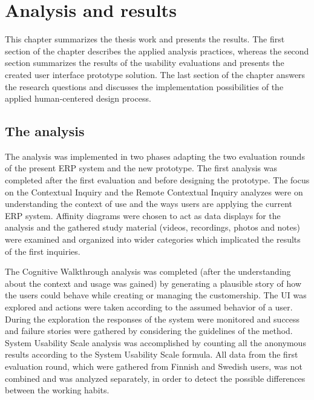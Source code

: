 \documentclass[12pt,a4paper,oneside,pdftex]{report}
\begin{document}
\chapter{Analysis and results}
\label{chapter:analysis}

This chapter summarizes the thesis work and presents the results. The first section of the chapter describes the applied analysis practices, whereas the second section summarizes the results of the usability evaluations and presents the created user interface prototype solution. The last section of the chapter answers the research questions and discusses the implementation possibilities of the applied human-centered design process. 

\section{The analysis}
\label{sec:analysismethods}
The analysis was implemented in two phases adapting the two evaluation rounds of the present ERP system and the new prototype. The first analysis was completed after the first evaluation and before designing the prototype. The focus on the Contextual Inquiry and the Remote Contextual Inquiry analyzes were on understanding the context of use and the ways users are applying the current ERP system. Affinity diagrams were chosen to act as data displays for the analysis and the gathered study material (videos, recordings, photos and notes) were examined and organized into wider categories which implicated the results of the first inquiries. 

The Cognitive Walkthrough analysis was completed (after the understanding about the context and usage was gained) by generating a plausible story of how the users could behave while creating or managing the customership. The UI was explored and actions were taken according to the assumed behavior of a user. During the exploration the responses of the system were monitored and success and failure stories were gathered by considering the guidelines of the method. System Usability Scale analysis was accomplished by counting all the anonymous results according to the System Usability Scale formula. All data from the first evaluation round, which were gathered from Finnish and Swedish users, was not combined and was analyzed separately, in order to detect the possible differences between the working habits.
\end{document}

